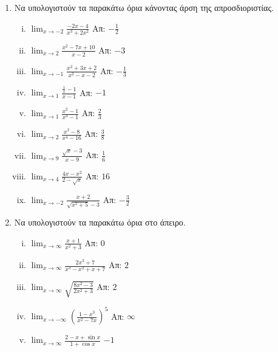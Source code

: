 

\everymath{\displaystyle}



\pagestyle{vangelis}

\begin{center}
\end{center}

\vspace{\baselineskip}


\begin{enumerate}
    \item Να υπολογιστούν τα παρακάτω όρια κάνοντας άρση της απροσδιοριστίας.

        \begin{enumerate}[i)]
            \item $\lim_{x\to -2}\frac{-2x-4}{x^3+2x^2}$ \hfill Απ: $-\frac{1}{2}$
            \item $\lim_{x\to 2}\frac{x^2-7x+10}{x-2}$ \hfill Απ: $-3$
            \item $\lim_{x\to -1}\frac{x^2+3x+2}{x^2-x-2}$ \hfill Απ: $-\frac{1}{3}$
            \item $\lim_{x\to 1}\frac{\frac{1}{x}-1}{x-1}$ \hfill Απ: $-1$
            \item $\lim_{x\to 1}\frac{x^2-1}{x^3-1}$ \hfill Απ: $\frac{2}{3}$
            \item $\lim_{x\to 2}\frac{x^3-8}{x^4-16}$ \hfill Απ: $\frac{3}{8}$
            \item $\lim_{x\to 9}\frac{\sqrt{x}-3}{x-9}$ \hfill Απ: $\frac{1}{6}$
            \item $\lim_{x\to 4}\frac{4x-x^2}{2-\sqrt{x}}$ \hfill Απ: $16$
            \item $\lim_{x\to -2}\frac{x+2}{\sqrt{x^2+5}-3}$ \hfill Απ: $-\frac{3}{2}$
        \end{enumerate}

    \item Να υπολογιστούν τα παρακάτω όρια στο άπειρο.

        \begin{enumerate}[i)]
            \item $\lim_{x\to \infty}\frac{x+1}{x^2+3}$ \hfill Απ: $0$
            \item $\lim_{x\to \infty}\frac{2x^3+7}{x^3-x^2+x+7}$ \hfill Απ: $2$
            \item $\lim_{x\to \infty}\sqrt{\frac{8x^2-3}{2x^2 +3}}$ \hfill Απ: $2$
            \item $\lim_{x\to -\infty}\left(\frac{1-x^3}{x^2-7x}\right)^5$ 
                \hfill Απ: $\infty$
            \item $\lim_{x\to \infty}\frac{2-x+\sin x}{1+\cos x}$ \hfill $-1$
        \end{enumerate}


\end{enumerate}
